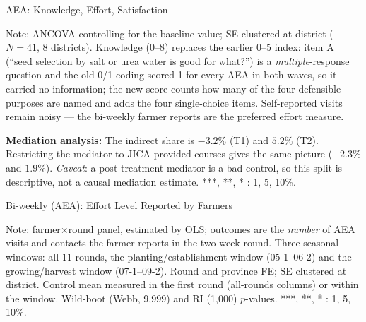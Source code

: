 \documentclass[aspectratio=169]{beamer}
\newcommand{\notefont}{\fontsize{5pt}{6pt}\selectfont}
\begin{document}
\begin{frame}{AEA: Knowledge, Effort, Satisfaction}
	\centering
	\begin{minipage}{0.94\textwidth}
		\notefont
		Note: ANCOVA controlling for the baseline value; SE clustered at district ($N=41$, 8 districts).
		Knowledge (0--8) replaces the earlier 0--5 index: item A (``seed selection by salt or urea
		water is good for what?'') is a \emph{multiple}-response question and the old 0/1 coding
		scored 1 for every AEA in both waves, so it carried no information; the new score counts how
		many of the four defensible purposes are named and adds the four single-choice items.
		Self-reported visits remain noisy --- the bi-weekly farmer reports are the preferred effort
		measure.
		\par \textbf{Mediation analysis:} The indirect share is $-3.2\%$ (T1) and $5.2\%$ (T2). 
		Restricting the mediator to
		JICA-provided courses gives the same picture ($-2.3\%$ and $1.9\%$).
		\emph{Caveat}: a post-treatment mediator is a bad control, so this split is descriptive,
		not a causal mediation estimate.
		***, **, * : 1, 5, 10\%.
	\end{minipage}
\end{frame}

\begin{frame}{Bi-weekly (AEA): Effort Level Reported by Farmers}
	\centering
	\begin{minipage}{0.94\textwidth}
		\notefont
		Note: farmer$\times$round panel, estimated by OLS; outcomes are the \emph{number} of AEA
		visits and contacts the farmer reports in the two-week round. Three seasonal windows: all 11 rounds, the
		planting/establishment window (05-1--06-2) and the growing/harvest window (07-1--09-2).
		Round and province FE; SE clustered at district. Control mean measured in the first round
		(all-rounds columns) or within the window. Wild-boot (Webb, 9{,}999) and RI (1{,}000)
		$p$-values. ***, **, * : 1, 5, 10\%.
	\end{minipage}
\end{frame}
\end{document}
